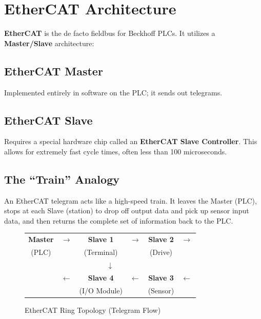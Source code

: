\documentclass[11pt,a4paper]{article}
\begin{document}
\section{EtherCAT Architecture}

\textbf{EtherCAT} is the de facto fieldbus for Beckhoff PLCs. It utilizes a \textbf{Master/Slave} architecture:

\subsection{EtherCAT Master}

Implemented entirely in software on the PLC; it sends out telegrams.

\subsection{EtherCAT Slave}

Requires a special hardware chip called an \textbf{EtherCAT Slave Controller}. This allows for extremely fast cycle times, often less than 100 microseconds.

\subsection{The ``Train'' Analogy}

An EtherCAT telegram acts like a high-speed train. It leaves the Master (PLC), stops at each Slave (station) to drop off output data and pick up sensor input data, and then returns the complete set of information back to the PLC.

\begin{figure}[h]
\centering
\begin{tabular}{|c|c|c|c|c|c|}
\hline
\textbf{Master} & $\rightarrow$ & \textbf{Slave 1} & $\rightarrow$ & \textbf{Slave 2} & $\rightarrow$ \\
(PLC) & & (Terminal) & & (Drive) & \\
\hline
\multicolumn{6}{|c|}{$\downarrow$} \\
\hline
& $\leftarrow$ & \textbf{Slave 4} & $\leftarrow$ & \textbf{Slave 3} & $\leftarrow$ \\
& & (I/O Module) & & (Sensor) & \\
\hline
\end{tabular}
\caption{EtherCAT Ring Topology (Telegram Flow)}
\end{figure}
\end{document}
